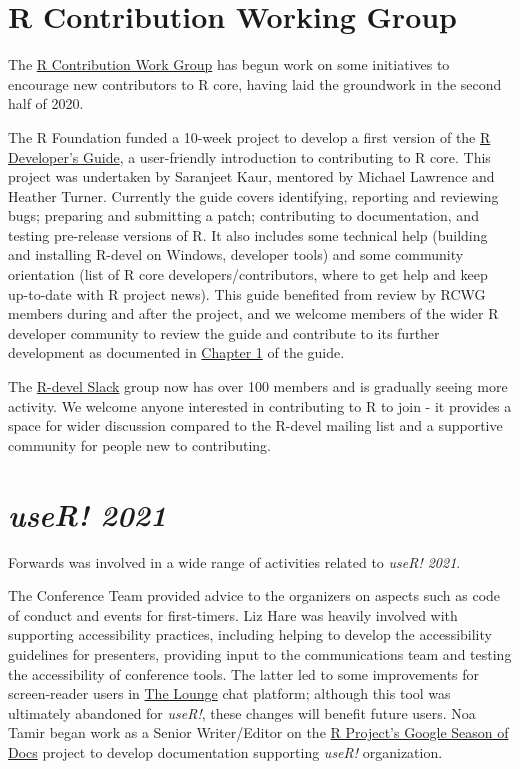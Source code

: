 \section{R Contribution Working Group}

The \href{https://forwards.github.io/rcontribution/working-group}{R Contribution Work Group} has begun work on some initiatives to encourage new contributors to R core, having laid the groundwork in the second half of 2020.

The R Foundation funded a 10-week project to develop a first version of the \href{https://forwards.github.io/rdevguide/}{R Developer's Guide}, a user-friendly introduction to contributing to R core. This project was undertaken by Saranjeet Kaur, mentored by Michael Lawrence and Heather Turner. Currently the guide covers identifying, reporting and reviewing bugs; preparing and submitting a patch; contributing to documentation, and testing pre-release versions of R. It also includes some technical help (building and installing R-devel on Windows, developer tools) and some community orientation (list of R core developers/contributors, where to get help and keep up-to-date with R project news). This guide benefited from review by RCWG members during and after the project, and we welcome members of the wider R developer community to review the guide and contribute to its further development as documented in \href{https://forwards.github.io/rdevguide/introduction.html#how-to-contribute-to-this-guide}{Chapter 1} of the guide.

The \href{https://forwards.github.io/rcontribution/slack}{R-devel Slack} group now has over 100 members and is gradually seeing more activity. We welcome anyone interested in contributing to R to join - it provides a space for wider discussion compared to the R-devel mailing list and a supportive community for people new to contributing.

\section{\emph{useR! 2021}}

Forwards was involved in a wide range of activities related to \emph{useR! 2021}. 

The Conference Team provided advice to the organizers on aspects such as code of conduct and events for first-timers. Liz Hare was heavily involved with supporting accessibility practices, including helping to develop the accessibility guidelines for presenters, providing input to the communications team and testing the accessibility of conference tools. The latter led to some improvements for screen-reader users in \href{https://thelounge.chat/}{The Lounge} chat platform; although this tool was ultimately abandoned for \emph{useR!}, these changes will benefit future users. Noa Tamir began work as a Senior Writer/Editor on the \href{https://github.com/rstats-gsod/gsod2021/wiki/GSOD-2021-Proposal}{R Project's Google Season of Docs} project to develop documentation supporting \emph{useR!} organization.

